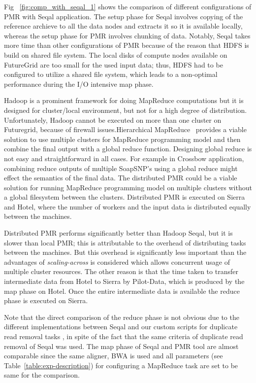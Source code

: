 \documentclass{acm_proc_article-sp}
\begin{document}
Fig ~\ref{fig:comp_with_seqal_1} shows the comparison of different
configurations of PMR with Seqal application.  The setup phase for Seqal involves
copying of the reference archieve to all the data nodes and extracts it so it is available locally,
whereas the setup phase for PMR involves chunking of data. Notably, Seqal takes more time than other configurations of PMR because of the reason that
HDFS is build on shared file system. The local disks of compute nodes available on FutureGrid are
too small for the used input data; thus, HDFS had to be configured to
utilize a shared file system, which leads to a
non-optimal performance during the I/O intensive map phase.


Hadoop is a prominent framework for doing MapReduce computations but it is
designed for cluster/local environment, but not for a high degree of
distribution. Unfortunately, Hadoop cannot be executed on more than
one cluster on Futuregrid, because of firewall issues.Hierarchical MapReduce~\cite{ecmls11-mr-autodock} provides a viable
solution to use multiple clusters for MapReduce programming model and
then combine the final output with a global reduce function. Designing
global reduce is not easy and straightforward in all cases. For
example in Crossbow application, combining reduce outputs of multiple
SoapSNP's using a global reduce might effect the semantics of the
final data. The distributed PMR could be a viable solution for running
MapReduce programming model on multiple clusters without a global filesystem between the clusters. Distributed PMR
is executed on Sierra and Hotel, where the number of workers and the
input data is distributed equally between the machines.

Distributed PMR performs significantly better than Hadoop Seqal, but
it is slower than local PMR; this is attributable to the overhead of
distributing tasks between the machines.  But this overhead is
significantly less important than the advantages of
\textit{scaling-across} is considered which allows concurrent usage of
multiple cluster resources. The other reason is that the time taken to transfer intermediate data from Hotel to Sierra by Pilot-Data, which is produced by the map phase on Hotel.
 Once the entire intermediate data is available the reduce phase is executed on Sierra. 

Note that the direct comparison of the reduce phase is not obvious due to the different implementations between Seqal and our custom scripts for duplicate read removal tasks , in spite of the fact that the same
criteria of duplicate read removal of Seqal\cite{seal_2011_mapred} was
used. The map phase of Seqal and PMR tool are almost comparable since
the same aligner, BWA is used and all parameters (see
Table~\ref{table:exp-description}) for configuring a MapReduce task
are set to be same for the comparison.
\end{document}
